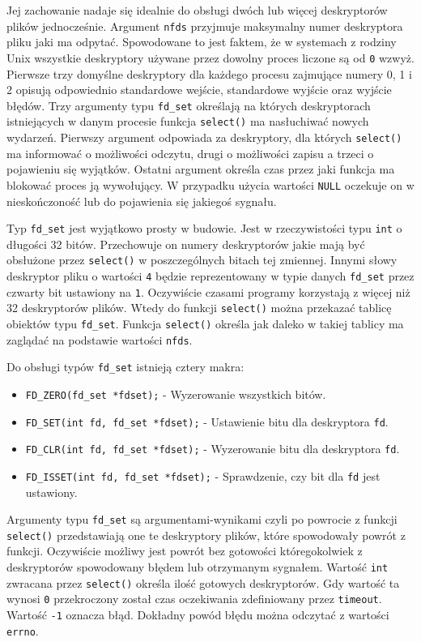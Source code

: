 \documentclass[11pt]{scrartcl}
\begin{document}
Jej zachowanie nadaje się idealnie do obsługi dwóch lub więcej deskryptorów plików jednocześnie. Argument \texttt{nfds} przyjmuje maksymalny numer deskryptora pliku jaki ma odpytać. Spowodowane to jest faktem, że w systemach z rodziny Unix wszystkie deskryptory używane przez dowolny proces liczone są od \texttt{0} wzwyż. Pierwsze trzy domyślne deskryptory dla każdego procesu zajmujące numery 0, 1 i 2 opisują odpowiednio standardowe wejście, standardowe wyjście oraz wyjście błędów. Trzy argumenty typu \texttt{fd\_set} określają na których deskryptorach istniejących w danym procesie funkcja \texttt{select()} ma nasłuchiwać nowych wydarzeń. Pierwszy argument odpowiada za deskryptory, dla których \texttt{select()} ma informować o możliwości odczytu, drugi o możliwości zapisu a trzeci o pojawieniu się wyjątków. Ostatni argument określa czas przez jaki funkcja ma blokować proces ją wywołujący. W przypadku użycia wartości \texttt{NULL} oczekuje on w nieskończoność lub do pojawienia się jakiegoś sygnału.

Typ \texttt{fd\_set} jest wyjątkowo prosty w budowie. Jest w rzeczywistości typu \texttt{int} o długości 32 bitów. Przechowuje on numery deskryptorów jakie mają być obsłużone przez \texttt{select()} w poszczególnych bitach tej zmiennej. Innymi słowy deskryptor pliku o wartości \texttt{4} będzie reprezentowany w typie danych \texttt{fd\_set} przez czwarty bit ustawiony na \texttt{1}. Oczywiście czasami programy korzystają z więcej niż 32 deskryptorów plików. Wtedy do funkcji \texttt{select()} można przekazać tablicę obiektów typu \texttt{fd\_set}. Funkcja \texttt{select()} określa jak daleko w takiej tablicy ma zaglądać na podstawie wartości \texttt{nfds}.

Do obsługi typów \texttt{fd\_set} istnieją cztery makra:

\begin{itemize}
\itemsep1pt\parskip0pt
\item
  \texttt{FD\_ZERO(fd\_set *fdset);} - Wyzerowanie wszystkich bitów.
\item
  \texttt{FD\_SET(int fd, fd\_set *fdset);} - Ustawienie bitu dla
  deskryptora \texttt{fd}.
\item
  \texttt{FD\_CLR(int fd, fd\_set *fdset);} - Wyzerowanie bitu dla
  deskryptora \texttt{fd}.
\item
  \texttt{FD\_ISSET(int fd, fd\_set *fdset);} - Sprawdzenie, czy bit dla \texttt{fd} jest ustawiony.
\end{itemize}

Argumenty typu \texttt{fd\_set} są argumentami-wynikami czyli po powrocie z funkcji \texttt{select()} przedstawiają one te deskryptory plików, które spowodowały powrót z funkcji. Oczywiście możliwy jest powrót bez gotowości któregokolwiek z deskryptorów spowodowany błędem lub otrzymanym sygnałem. Wartość \texttt{int} zwracana przez \texttt{select()} określa ilość gotowych deskryptorów. Gdy wartość ta wynosi \texttt{0} przekroczony został czas oczekiwania zdefiniowany przez \texttt{timeout}. Wartość \texttt{-1} oznacza błąd. Dokładny powód błędu można odczytać z wartości \texttt{errno}.
\end{document}
